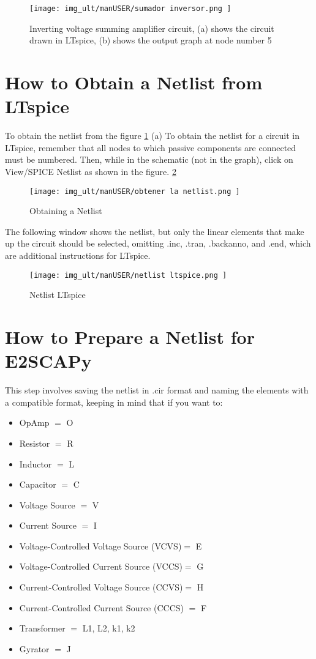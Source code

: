 \begin{figure}[H]
	\centering\texttt{[image: img\_ult/manUSER/sumador inversor.png
	]}
	\caption{Inverting voltage summing amplifier circuit, (a) shows the circuit drawn in LTspice, (b) shows the output graph at node number 5}
	\label{img:sumador inversor}
\end{figure} 

\section{How to Obtain a Netlist from LTspice}
To obtain the netlist from the figure \ref{img:sumador inversor} (a) 
To obtain the netlist for a circuit in LTspice, remember that all nodes to which passive components are connected must be numbered. Then, while in the schematic (not in the graph), click on View/SPICE Netlist as shown in the figure. \ref{img:obtener la netlist}
\begin{figure}[H]
	\centering\texttt{[image: img\_ult/manUSER/obtener la netlist.png
	]}
	\caption{Obtaining a Netlist}
	\label{img:obtener la netlist}
\end{figure} 

The following window shows the netlist, but only the linear elements that make up the circuit should be selected, omitting .inc, .tran, .backanno, and .end, which are additional instructions for LTspice.

\begin{figure}[H]
	\centering\texttt{[image: img\_ult/manUSER/netlist ltspice.png
	]}
	\caption{Netlist LTspice}
	\label{img:netlist LTspice}
\end{figure} 

\section{How to Prepare a Netlist for E2SCAPy}
This step involves saving the netlist in .cir format and naming the elements with a compatible format, keeping in mind that if you want to:
\begin{itemize}
	\item OpAmp $=$ O
	\item Resistor $=$ R
	\item Inductor $=$ L
	\item Capacitor $=$ C
	\item Voltage Source $=$ V
	\item Current Source $=$ I
	\item Voltage-Controlled Voltage Source (VCVS)$=$ E
	\item Voltage-Controlled Current Source (VCCS)$=$ G
	\item Current-Controlled Voltage Source (CCVS)$=$ H
	\item Current-Controlled Current Source (CCCS) $=$ F
	\item Transformer $=$ L1, L2, k1, k2
	\item Gyrator $=$ J
\end{itemize}

